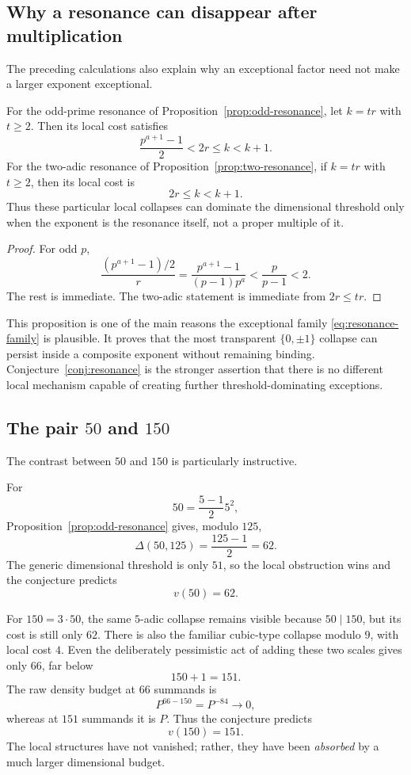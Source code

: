 \documentclass[../Axiomathic.tex]{subfiles}
\begin{document}
\subsection{Why a resonance can disappear after multiplication}

The preceding calculations also explain why an exceptional factor need not make a larger exponent exceptional.

\begin{prop}\label{prop:absorption}
For the odd-prime resonance of Proposition~\ref{prop:odd-resonance}, let $k=tr$ with $t\ge2$.  Then its local cost satisfies
\[
  \frac{p^{a+1}-1}{2}<2r\le k<k+1.
\]
For the two-adic resonance of Proposition~\ref{prop:two-resonance}, if $k=tr$ with $t\ge2$, then its local cost is
\[
  2r\le k<k+1.
\]
Thus these particular local collapses can dominate the dimensional threshold only when the exponent is the resonance itself, not a proper multiple of it.
\end{prop}

\begin{proof}
For odd $p$,
\[
 \frac{(p^{a+1}-1)/2}{r}
 =\frac{p^{a+1}-1}{(p-1)p^a}<\frac{p}{p-1}<2.
\]
The rest is immediate.  The two-adic statement is immediate from $2r\le tr$.
\end{proof}

This proposition is one of the main reasons the exceptional family \eqref{eq:resonance-family} is plausible.  It proves that the most transparent $\{0,\pm1\}$ collapse can persist inside a composite exponent without remaining binding.  Conjecture~\ref{conj:resonance} is the stronger assertion that there is no different local mechanism capable of creating further threshold-dominating exceptions.

\subsection{The pair $50$ and $150$}

The contrast between $50$ and $150$ is particularly instructive.

For
\[
  50=\frac{5-1}{2}5^2,
\]
Proposition~\ref{prop:odd-resonance} gives, modulo $125$,
\[
  \Delta(50,125)=\frac{125-1}{2}=62.
\]
The generic dimensional threshold is only $51$, so the local obstruction wins and the conjecture predicts
\[
  \boxed{v(50)=62.}
\]

For $150=3\cdot50$, the same $5$-adic collapse remains visible because $50\mid150$, but its cost is still only $62$.  There is also the familiar cubic-type collapse modulo $9$, with local cost $4$.  Even the deliberately pessimistic act of adding these two scales gives only $66$, far below
\[
  150+1=151.
\]
The raw density budget at $66$ summands is
\[
  P^{66-150}=P^{-84}\to0,
\]
whereas at $151$ summands it is $P$.  Thus the conjecture predicts
\[
  \boxed{v(150)=151.}
\]
The local structures have not vanished; rather, they have been \emph{absorbed} by a much larger dimensional budget.
\end{document}

